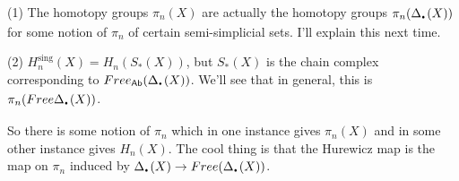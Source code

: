(1) The homotopy groups $\pi_n(X)$ are actually the homotopy groups $\pi_n(\Delta_\udot(X))$ for some notion of $\pi_n$ of certain semi-simplicial sets. I'll explain this next time.

(2) $H_n^{\text{sing}}(X)=H_n(S_*(X))$, but $S_*(X)$ is the chain complex corresponding to $Free_\ab(\Delta_\udot(X))$. We'll see that in general, this is $\pi_n(Free \Delta_\udot(X))$.

So there is some notion of $\pi_n$ which in one instance gives $\pi_n(X)$ and in some other instance gives $H_n(X)$. The cool thing is that the Hurewicz map is the map on $\pi_n$ induced by $\Delta_\udot(X)\to Free(\Delta_\udot(X))$.